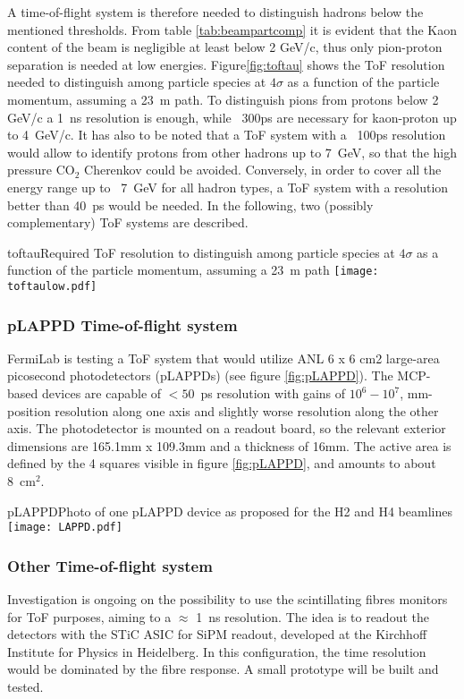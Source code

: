 A time-of-flight system  is therefore needed to distinguish hadrons below the mentioned thresholds.  From table \ref{tab:beampartcomp} it is evident that the Kaon content of the beam is negligible at least below 2 GeV/c, thus  only pion-proton separation is needed at low energies. Figure\ref{fig:toftau} shows the ToF resolution needed to distinguish among particle species at $4\sigma$ as a function of the particle momentum, assuming a 23~m path. To distinguish pions from protons below 2 GeV/c a 1~ns resolution is enough, while ~300ps are necessary for kaon-proton up to  4~GeV/c. It has also to be noted that a ToF system with a ~100ps resolution would allow to identify protons from other hadrons up to 7~GeV, so that the high pressure CO$_2$ Cherenkov could be avoided. Conversely, in order to cover all the energy range up to ~7~GeV for all hadron  types, a ToF system with a resolution better than 40~ps would be needed.
In the following, two (possibly complementary) ToF systems are described.
\begin{cdrfigure}{toftau}{Required ToF resolution to  distinguish among particle species at $4\sigma$ as a function of the particle momentum, assuming a 23~m path }
\texttt{[image: toftaulow.pdf]}
\end{cdrfigure}

\subsubsection{pLAPPD Time-of-flight system}
FermiLab is testing a ToF system that would utilize ANL 6 x 6 cm2
large-area picosecond photodetectors (pLAPPDs) (see figure \ref{fig:pLAPPD}).
 The MCP-based devices
are capable of $< 50$~ps resolution with gains of $10^6-10^7$,
mm-position resolution along one axis and slightly worse resolution
along the other axis.  The photodetector is mounted on a readout
board, so the relevant exterior dimensions are 165.1mm x 109.3mm and a
thickness of 16mm. The active area is defined by the 4 squares visible in figure \ref{fig:pLAPPD}, and amounts to about 8~cm$^2$.
\begin{cdrfigure}[pLAPPD]{pLAPPD}{Photo of one pLAPPD device as proposed for the H2 and H4 beamlines}
\texttt{[image: LAPPD.pdf]}
\end{cdrfigure}

\subsubsection{Other Time-of-flight system}
Investigation is ongoing on the possibility  to use the  scintillating fibres monitors for ToF purposes, aiming to a $\approx $ 1~ns resolution. The idea is to readout the detectors with the STiC ASIC for SiPM readout, developed at the  Kirchhoff Institute for Physics in Heidelberg. In this configuration, the time resolution would be dominated by the fibre response. A small prototype will be built and tested.
